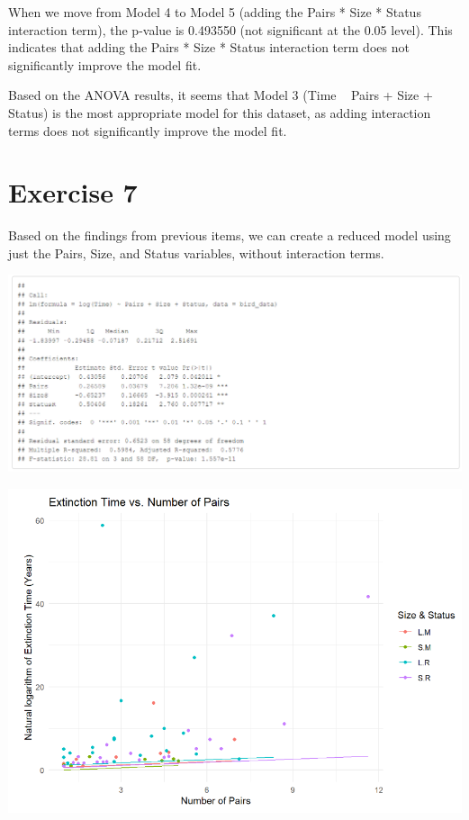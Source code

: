 \documentclass{article}
\begin{document}
When we move from Model 4 to Model 5 (adding the Pairs * Size * Status interaction term), the p-value is 0.493550 (not significant at the 0.05 level). This indicates that adding the Pairs * Size * Status interaction term does not significantly improve the model fit.

Based on the ANOVA results, it seems that Model 3 (Time ~ Pairs + Size + Status) is the most appropriate model for this dataset, as adding interaction terms does not significantly improve the model fit.

\section{Exercise 7}
Based on the findings from previous items, we can create a reduced model using just the Pairs, Size, and Status variables, without interaction terms.


\includegraphics[scale=0.5]{tables/all-added.png}


\begin{center}
\includegraphics[scale=0.5]{graphs/graph7.png}
\end{center}
\end{document}

